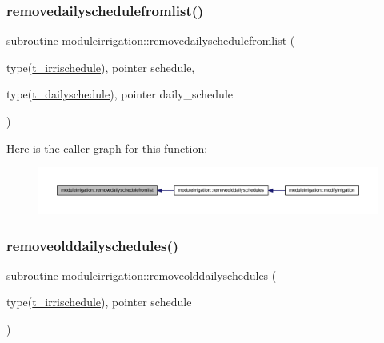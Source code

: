 \subsubsection{\texorpdfstring{removedailyschedulefromlist()}{removedailyschedulefromlist()}}
{\footnotesize\ttfamily subroutine moduleirrigation\+::removedailyschedulefromlist (\begin{DoxyParamCaption}\item[{type(\mbox{\hyperlink{structmoduleirrigation_1_1t__irrischedule}{t\+\_\+irrischedule}}), pointer}]{schedule,  }\item[{type(\mbox{\hyperlink{structmoduleirrigation_1_1t__dailyschedule}{t\+\_\+dailyschedule}}), pointer}]{daily\+\_\+schedule }\end{DoxyParamCaption})\hspace{0.3cm}{\ttfamily [private]}}

Here is the caller graph for this function\+:\nopagebreak
\begin{figure}[H]
\begin{center}
\leavevmode
\includegraphics[width=350pt]{namespacemoduleirrigation_ac485f39127c7b84771cf5b8e2a64e5d7_icgraph}
\end{center}
\end{figure}
\mbox{\label{namespacemoduleirrigation_a80324762e72192acef959aaff9c21571}} 
\subsubsection{\texorpdfstring{removeolddailyschedules()}{removeolddailyschedules()}}
{\footnotesize\ttfamily subroutine moduleirrigation\+::removeolddailyschedules (\begin{DoxyParamCaption}\item[{type(\mbox{\hyperlink{structmoduleirrigation_1_1t__irrischedule}{t\+\_\+irrischedule}}), pointer}]{schedule }\end{DoxyParamCaption})\hspace{0.3cm}{\ttfamily [private]}}

